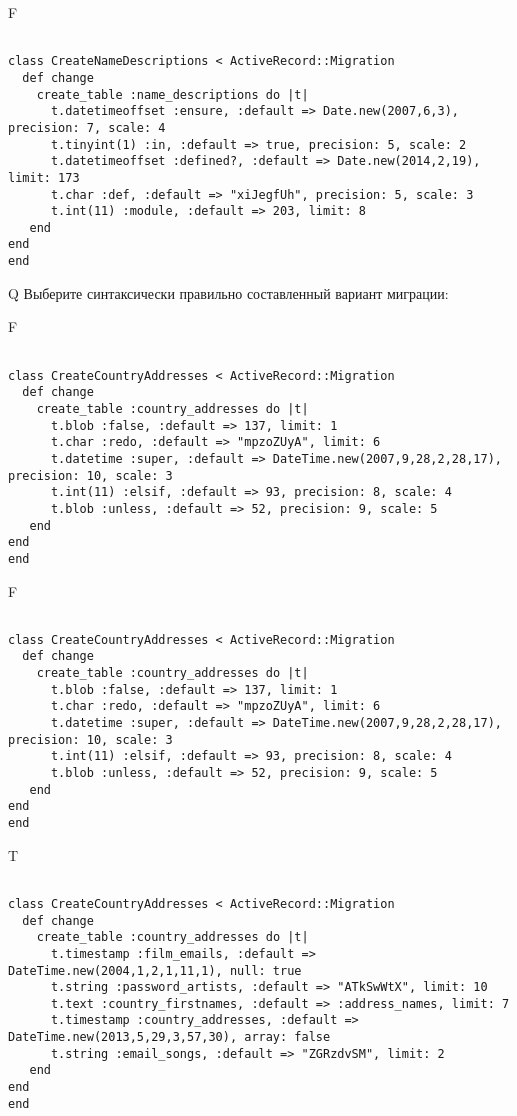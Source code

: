 F
\begin{verbatim}
		
class CreateNameDescriptions < ActiveRecord::Migration 
  def change 
    create_table :name_descriptions do |t| 
      t.datetimeoffset :ensure, :default => Date.new(2007,6,3), precision: 7, scale: 4
      t.tinyint(1) :in, :default => true, precision: 5, scale: 2
      t.datetimeoffset :defined?, :default => Date.new(2014,2,19), limit: 173
      t.char :def, :default => "xiJegfUh", precision: 5, scale: 3
      t.int(11) :module, :default => 203, limit: 8
   end
end
end
\end{verbatim}

Q
Выберите синтаксически правильно составленный вариант миграции:

F
\begin{verbatim}
		
class CreateCountryAddresses < ActiveRecord::Migration 
  def change 
    create_table :country_addresses do |t| 
      t.blob :false, :default => 137, limit: 1
      t.char :redo, :default => "mpzoZUyA", limit: 6
      t.datetime :super, :default => DateTime.new(2007,9,28,2,28,17), precision: 10, scale: 3
      t.int(11) :elsif, :default => 93, precision: 8, scale: 4
      t.blob :unless, :default => 52, precision: 9, scale: 5
   end
end
end
\end{verbatim}

F
\begin{verbatim}
		
class CreateCountryAddresses < ActiveRecord::Migration 
  def change 
    create_table :country_addresses do |t| 
      t.blob :false, :default => 137, limit: 1
      t.char :redo, :default => "mpzoZUyA", limit: 6
      t.datetime :super, :default => DateTime.new(2007,9,28,2,28,17), precision: 10, scale: 3
      t.int(11) :elsif, :default => 93, precision: 8, scale: 4
      t.blob :unless, :default => 52, precision: 9, scale: 5
   end
end
end
\end{verbatim}

T
\begin{verbatim}
		
class CreateCountryAddresses < ActiveRecord::Migration 
  def change 
    create_table :country_addresses do |t| 
      t.timestamp :film_emails, :default => DateTime.new(2004,1,2,1,11,1), null: true
      t.string :password_artists, :default => "ATkSwWtX", limit: 10
      t.text :country_firstnames, :default => :address_names, limit: 7
      t.timestamp :country_addresses, :default => DateTime.new(2013,5,29,3,57,30), array: false
      t.string :email_songs, :default => "ZGRzdvSM", limit: 2
   end
end
end
\end{verbatim}

